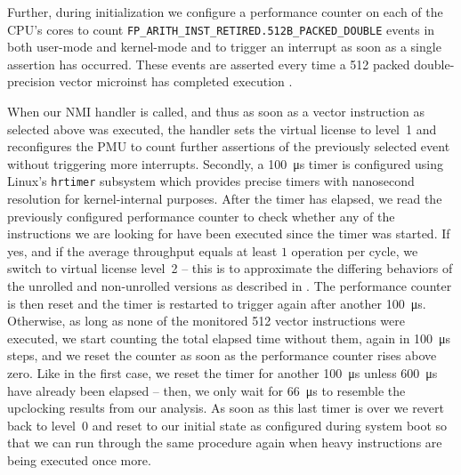 Further, during initialization we configure a performance counter on each of the \gls{CPU}'s cores to count \texttt{FP\_ARITH\_INST\_RETIRED.512B\_PACKED\_DOUBLE} events in both user-mode and kernel-mode and to trigger an interrupt as soon as a single assertion has occurred. These events are asserted every time a \SI[number-unit-product=-]{512}{\bit} packed double-precision vector \gls{microinst} has completed execution \cite{intelsdmsysprogguide}.

When our \gls{NMI} handler is called, and thus as soon as a vector instruction as selected above was executed, the handler sets the virtual license to level~1 and reconfigures the \gls{PMU} to count further assertions of the previously selected event without triggering more interrupts. Secondly, a \SI{100}{\micro\second} timer is configured using \gls{Linux}'s \texttt{hrtimer} subsystem which provides precise timers with nanosecond resolution for kernel-internal purposes. After the timer has elapsed, we read the previously configured performance counter to check whether any of the instructions we are looking for have been executed since the timer was started. If yes, and if the average throughput equals at least $1$ operation per cycle, we switch to virtual license level~2 -- this is to approximate the differing behaviors of the unrolled and non-unrolled versions as described in . The performance counter is then reset and the timer is restarted to trigger again after another \SI{100}{\micro\second}. Otherwise, as long as none of the monitored \SI[number-unit-product=-]{512}{\bit} vector instructions were executed, we start counting the total elapsed time without them, again in \SI{100}{\micro\second} steps, and we reset the counter as soon as the performance counter rises above zero. Like in the first case, we reset the timer for another \SI{100}{\micro\second} unless \SI{600}{\micro\second} have already been elapsed -- then, we only wait for \SI{66}{\micro\second} to resemble the upclocking results from our analysis. As soon as this last timer is over we revert back to level~0 and reset to our initial state as configured during system boot so that we can run through the same procedure again when heavy instructions are being executed once more.

